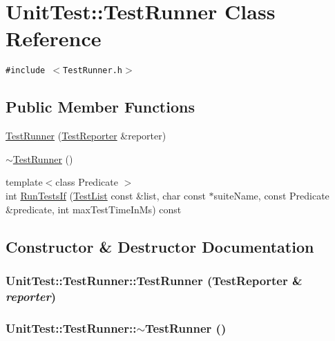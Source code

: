 \hypertarget{class_unit_test_1_1_test_runner}{
\section{UnitTest::TestRunner Class Reference}
\label{class_unit_test_1_1_test_runner}
}
{\tt \#include $<$TestRunner.h$>$}

\subsection*{Public Member Functions}
\begin{CompactItemize}
\item 
\hyperlink{class_unit_test_1_1_test_runner_bef5ed23197231f816a6aa63ec0ba535}{TestRunner} (\hyperlink{class_unit_test_1_1_test_reporter}{TestReporter} \&reporter)
\item 
\hyperlink{class_unit_test_1_1_test_runner_d73246549efec634edcf1250a73a1b13}{$\sim$TestRunner} ()
\item 
{\footnotesize template$<$class Predicate $>$ }\\int \hyperlink{class_unit_test_1_1_test_runner_d57c9afbdf7f12eaf6776b0c8e655157}{RunTestsIf} (\hyperlink{class_unit_test_1_1_test_list}{TestList} const \&list, char const $\ast$suiteName, const Predicate \&predicate, int maxTestTimeInMs) const 
\end{CompactItemize}


\subsection{Constructor \& Destructor Documentation}
\hypertarget{class_unit_test_1_1_test_runner_bef5ed23197231f816a6aa63ec0ba535}{
\subsubsection[{TestRunner}]{\setlength{\rightskip}{0pt plus 5cm}UnitTest::TestRunner::TestRunner ({\bf TestReporter} \& {\em reporter})}}
\label{class_unit_test_1_1_test_runner_bef5ed23197231f816a6aa63ec0ba535}


\hypertarget{class_unit_test_1_1_test_runner_d73246549efec634edcf1250a73a1b13}{
\subsubsection[{$\sim$TestRunner}]{\setlength{\rightskip}{0pt plus 5cm}UnitTest::TestRunner::$\sim$TestRunner ()}}
\label{class_unit_test_1_1_test_runner_d73246549efec634edcf1250a73a1b13}




